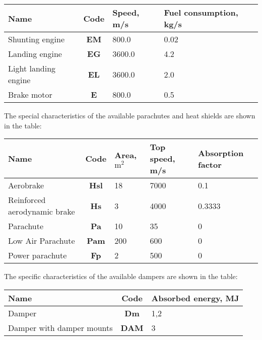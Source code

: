 \documentclass[12pt,a4paper]{article}
\begin{document}
\begin{center}
\begin{tabular}{ |p{6.5cm}|c|p{3.5cm}|p{3.5cm}| }
  \hline
  \textbf{Name} & \textbf{Code} &
   \textbf{Speed, m/s} & \textbf{Fuel consumption, kg/s}\\
   \hline
   Shunting engine & \textbf{EM} & 800.0 & 0.02 \\
   \hline
   Landing engine & \textbf{EG} & 3600.0 & 4.2 \\
   \hline
   Light landing engine & \textbf{EL} & 3600.0 & 2.0 \\
   \hline
   Brake motor & \textbf{E} & 800.0 & 0.5 \\
  \hline
\end{tabular}
\end{center}

The special characteristics of the available parachutes and heat shields are shown in the table:

\begin{center}
\begin{tabular}{ |p{4cm}|c|p{3cm}|p{3cm}|p{3cm}| }
  \hline
  \textbf{Name} & \textbf{Code} &
   \textbf{Area, $\text{m}^2$} & \textbf{Top speed, m/s} &
   \textbf{Absorption factor} \\
  \hline
Aerobrake & \textbf{Hsl} & 18 & 7000 & 0.1 \\
\hline
Reinforced aerodynamic brake & \textbf{Hs} & 3 & 4000 & 0.3333 \\
\hline
Parachute & \textbf{Pa} & 10 & 35 & 0 \\
\hline
Low Air Parachute & \textbf{Pam} & 200 & 600 & 0 \\
\hline
Power parachute & \textbf{Fp} & 2 & 500 & 0 \\
\hline
\end{tabular}
\end{center}

The specific characteristics of the available dampers are shown in the table:

\begin{center}
\begin{tabular}{ |p{8cm}|c|p{5cm}| }
  \hline
 \textbf{Name} & \textbf{Code} &
   \textbf{Absorbed energy, MJ} \\
   \hline
   Damper & \textbf{Dm} & 1,2 \\
   \hline
   Damper with damper mounts & \textbf{DAM} & 3 \\
  \hline
\end{tabular}
\end{center}
\end{document}
